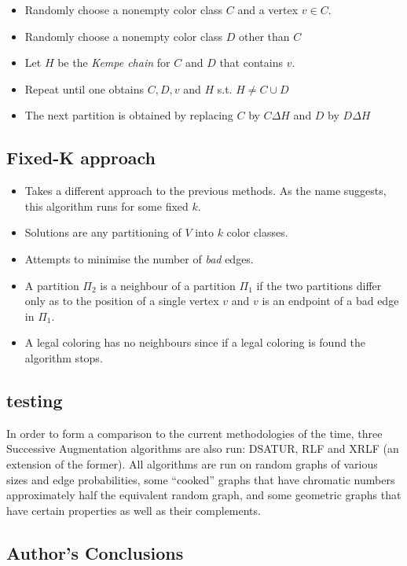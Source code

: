 \begin{itemize}
	\item Randomly choose a nonempty color class $C$ and a vertex $v \in C$.
	\item Randomly choose a nonempty color class $D$ other than $C$
	\item Let $H$ be the \emph{Kempe chain} for $C$ and $D$ that contains $v$.
	\item Repeat until one obtains $C , D , v$ and $H$ s.t. $H \neq C \cup D$
	\item The next partition is obtained by replacing $C$ by $C \Delta H$ and $D$ by $D \Delta H$ 
	\end{itemize}

\subsection{Fixed-K approach}
	\begin{itemize}
	\item Takes a different approach to the previous methods. As the name suggests, this algorithm runs for some fixed $k$.
	\item Solutions are any partitioning of $V$ into $k$ color classes.
	\item Attempts to minimise the number of \emph{bad} edges.
	\item A partition $\Pi_2$ is a neighbour of a partition $\Pi_1$ if the two partitions differ only as to the position of a single vertex $v$ and $v$ is an endpoint of a bad edge in $\Pi_1$.
	\item A legal coloring has no neighbours since if a legal coloring is found the algorithm stops.
	\end{itemize}

\subsection{testing}

In order to form a comparison to the current methodologies of the time, three Successive Augmentation algorithms are also run: DSATUR, RLF and XRLF (an extension of the former).
All algorithms are run on random graphs of various sizes and edge probabilities, some ``cooked'' graphs that have chromatic numbers approximately half the equivalent random graph, and some geometric graphs that have certain properties as well as their complements.

\subsection{Author's Conclusions}

